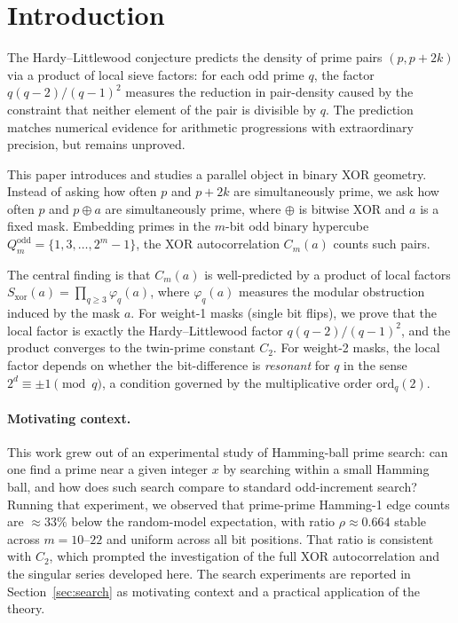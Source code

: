 \documentclass[12pt]{article}
\newcommand{\ord}{\mathrm{ord}}
\begin{document}
\tableofcontents
\newpage

\section{Introduction}
\label{sec:intro}

The Hardy--Littlewood conjecture \citep{hardylittlewood1923} predicts the
density of prime pairs $(p, p+2k)$ via a product of local sieve factors:
for each odd prime $q$, the factor $q(q-2)/(q-1)^2$ measures the reduction
in pair-density caused by the constraint that neither element of the pair
is divisible by $q$.  The prediction matches numerical evidence for arithmetic
progressions with extraordinary precision, but remains unproved.

This paper introduces and studies a parallel object in binary XOR geometry.
Instead of asking how often $p$ and $p + 2k$ are simultaneously prime,
we ask how often $p$ and $p \oplus a$ are simultaneously prime,
where $\oplus$ is bitwise XOR and $a$ is a fixed mask.
Embedding primes in the $m$-bit odd binary hypercube
$Q_m^{\mathrm{odd}} = \{1, 3, \ldots, 2^m - 1\}$,
the XOR autocorrelation $C_m(a)$ counts such pairs.

The central finding is that $C_m(a)$ is well-predicted by a product of local factors
$S_{\mathrm{xor}}(a) = \prod_{q \geq 3} \varphi_q(a)$,
where $\varphi_q(a)$ measures the modular obstruction induced by the mask $a$.
For weight-1 masks (single bit flips), we prove that the local factor is
exactly the Hardy--Littlewood factor $q(q-2)/(q-1)^2$,
and the product converges to the twin-prime constant $C_2$.
For weight-2 masks, the local factor depends on whether the bit-difference is
\emph{resonant} for $q$ in the sense $2^d \equiv \pm 1 \pmod q$, a condition
governed by the multiplicative order $\ord_q(2)$.

\paragraph{Motivating context.}
This work grew out of an experimental study of Hamming-ball prime search:
can one find a prime near a given integer $x$ by searching within a small
Hamming ball, and how does such search compare to standard odd-increment search?
Running that experiment, we observed that prime-prime Hamming-1 edge counts
are $\approx 33\%$ below the random-model expectation, with ratio
$\rho \approx 0.664$ stable across $m = 10$--$22$ and uniform across all bit positions.
That ratio is consistent with $C_2$,
which prompted the investigation of the full XOR autocorrelation
and the singular series developed here.
The search experiments are reported in Section~\ref{sec:search}
as motivating context and a practical application of the theory.
\end{document}
